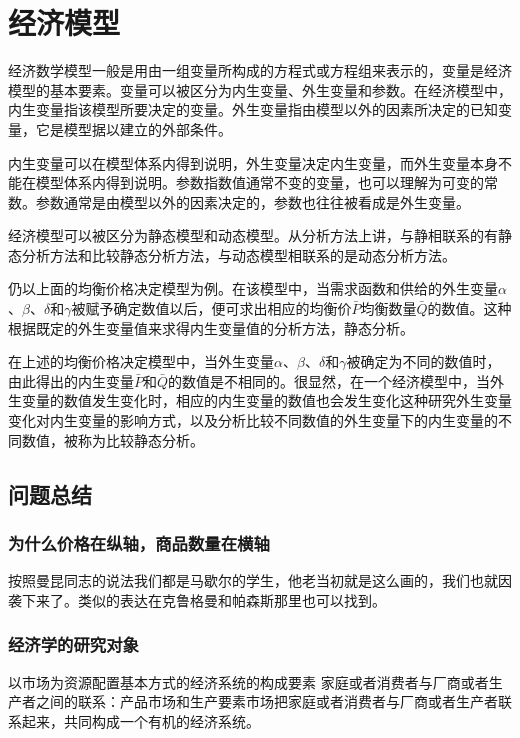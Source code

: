 \chapter{经济模型}
\label{sec:economic-models}

经济数学模型一般是用由一组变量所构成的方程式或方程组来表示的，变量是经济模型的基本要素。变量可以被区分为内生变量、外生变量和参数。在经济模型中，内生变量指该模型所要决定的变量。外生变量指由模型以外的因素所决定的已知变量，它是模型据以建立的外部条件。

内生变量可以在模型体系内得到说明，外生变量决定内生变量，而外生变量本身不能在模型体系内得到说明。参数指数值通常不变的变量，也可以理解为可变的常数。参数通常是由模型以外的因素决定的，参数也往往被看成是外生变量。

经济模型可以被区分为静态模型和动态模型。从分析方法上讲，与静相联系的有静态分析方法和比较静态分析方法，与动态模型相联系的是动态分析方法。

仍以上面的均衡价格决定模型为例。在该模型中，当需求函数和供给的外生变量$\alpha$、$\beta$、$\delta$和$\gamma$被赋予确定数值以后，便可求出相应的均衡价$\bar P$均衡数量$\bar Q$的数值。这种根据既定的外生变量值来求得内生变量值的分析方法，静态分析。

在上述的均衡价格决定模型中，当外生变量$\alpha$、$\beta$、$\delta$和$\gamma$被确定为不同的数值时，由此得出的内生变量$\bar P$和$\bar Q$的数值是不相同的。很显然，在一个经济模型中，当外生变量的数值发生变化时，相应的内生变量的数值也会发生变化这种研究外生变量变化对内生变量的影响方式，以及分析比较不同数值的外生变量下的内生变量的不同数值，被称为比较静态分析。

\section{问题总结}
\subsection{为什么价格在纵轴，商品数量在横轴}
按照曼昆同志的说法我们都是马歇尔的学生，他老当初就是这么画的，我们也就因袭下来了。类似的表达在克鲁格曼和帕森斯那里也可以找到。\cite{gordon1982}

\subsection{经济学的研究对象}
以市场为资源配置基本方式的经济系统的构成要素
家庭或者消费者与厂商或者生产者之间的联系：产品市场和生产要素市场把家庭或者消费者与厂商或者生产者联系起来，共同构成一个有机的经济系统。
